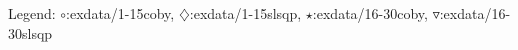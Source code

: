 Legend: {\color{NavyBlue}$\circ$}:exdata/1-15coby, {\color{Magenta}$\diamondsuit$}:exdata/1-15slsqp, {\color{Orange}$\star$}:exdata/16-30coby, {\color{CornflowerBlue}$\triangledown$}:exdata/16-30slsqp